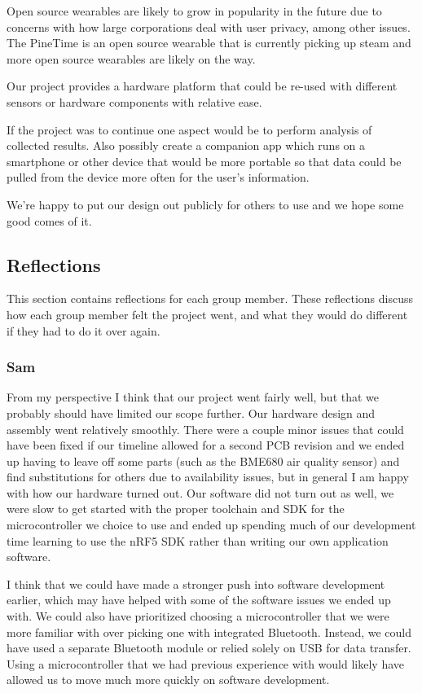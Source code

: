 Open source wearables are likely to grow in popularity in the future due to
concerns with how large corporations deal with user privacy, among other
issues.  The PineTime is an open source wearable that is currently picking
up steam and more open source wearables are likely on the way.

Our project provides a hardware platform that could be re-used with different
sensors or hardware components with relative ease.

If the project was to continue one aspect would be to perform analysis of collected results.
Also possibly create a companion app which runs on a smartphone or other device
that would be more portable so that data could be pulled from the device more often
for the user's information.

We're happy to put our design out publicly for others to use and we hope some
good comes of it.

\subsection{Reflections}

This section contains reflections for each group member. These reflections
discuss how each group member felt the project went, and what they would do
different if they had to do it over again.

\subsubsection{Sam}

From my perspective I think that our project went fairly well, but that we
probably should have limited our scope further. Our hardware design and assembly
went relatively smoothly. There were a couple minor issues that could have been
fixed if our timeline allowed for a second PCB revision and we ended up having
to leave off some parts (such as the BME680 air quality sensor) and find
substitutions for others due to availability issues, but in general I am happy
with how our hardware turned out. Our software did not turn out as well, we
were slow to get started with the proper toolchain and SDK for the
microcontroller we choice to use and ended up spending much of our development
time learning to use the nRF5 SDK rather than writing our own application
software.

I think that we could have made a stronger push into software development
earlier, which may have helped with some of the software issues we ended up
with. We could also have prioritized choosing a microcontroller that we were
more familiar with over picking one with integrated Bluetooth. Instead, we could
have used a separate Bluetooth module or relied solely on USB for data transfer.
Using a microcontroller that we had previous experience with would likely have
allowed us to move much more quickly on software development.

